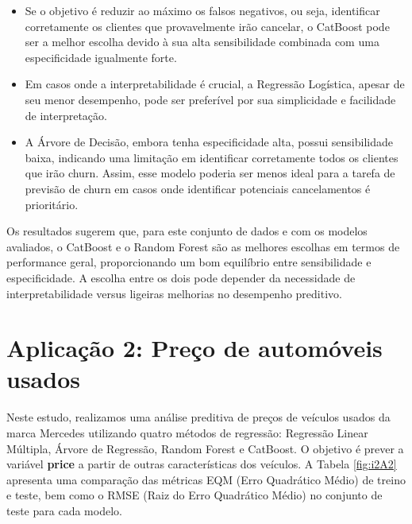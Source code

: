 \documentclass[a4paper,12pt]{article}[abntex2]
\begin{document}
\begin{itemize}
    \item Se o objetivo é reduzir ao máximo os falsos negativos, ou seja, identificar corretamente os clientes que provavelmente irão cancelar, o CatBoost pode ser a melhor escolha devido à sua alta sensibilidade combinada com uma especificidade igualmente forte.
    \item Em casos onde a interpretabilidade é crucial, a Regressão Logística, apesar de seu menor desempenho, pode ser preferível por sua simplicidade e facilidade de interpretação.
    \item A Árvore de Decisão, embora tenha especificidade alta, possui sensibilidade baixa, indicando uma limitação em identificar corretamente todos os clientes que irão churn. Assim, esse modelo poderia ser menos ideal para a tarefa de previsão de churn em casos onde identificar potenciais cancelamentos é prioritário.
\end{itemize}

Os resultados sugerem que, para este conjunto de dados e com os modelos avaliados, o CatBoost e o Random Forest são as melhores escolhas em termos de performance geral, proporcionando um bom equilíbrio entre sensibilidade e especificidade. A escolha entre os dois pode depender da necessidade de interpretabilidade versus ligeiras melhorias no desempenho preditivo.




\newpage
\section*{\textbf{Aplicação 2: Preço de automóveis usados}}

Neste estudo, realizamos uma análise preditiva de preços de veículos usados da marca Mercedes utilizando quatro métodos de regressão: Regressão Linear Múltipla, Árvore de Regressão, Random Forest e CatBoost. O objetivo é prever a variável \textbf{price} a partir de outras características dos veículos. A Tabela \ref{fig:i2A2} apresenta uma comparação das métricas EQM (Erro Quadrático Médio) de treino e teste, bem como o RMSE (Raiz do Erro Quadrático Médio) no conjunto de teste para cada modelo.
\end{document}
